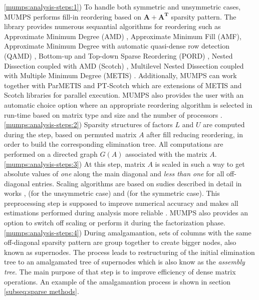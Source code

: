 \ref{mumps:analysis-steps:1}) To handle both symmetric and unsymmetric cases, MUMPS performs fill-in reordering based on $\boldsymbol{A} + \boldsymbol{A^T}$ sparsity pattern. The library provides numerous sequantial algorithms for reordering such as Approximate Minimum Degree (AMD) \cite{reordering:AMD}, Approximate Minimum Fill (AMF), Approximate Minimum Degree with automatic quasi-dense row detection (QAMD) \cite{reordering:QAMD}, Bottom-up and Top-down Sparse Reordering (PORD) \cite{reordering:PORD}, Nested Dissection coupled with AMD (Scotch) \cite{reordering:SCOTCH}, Multilevel Nested Dissection coupled with Multiple Minimum Degree (METIS) \cite{reordering:METIS}. Additionally, MUMPS can work together with ParMETIS and PT-Scotch which are extensions of METIS and Scotch libraries for parallel execution. MUMPS also provides the user with an automatic choice option where an appropriate reordering algorithm is selected in run-time based on matrix type and size and the number of processors \cite{mumps-manual}.\\


\ref{mumps:analysis-steps:2}) Sparsity structures of factors $L$ and $U$ are computed during the step, based on permuted matrix $A$ after fill reducing reordering, in order to build the corresponding elimination tree. All computations are performed on a directed graph $G(A)$ associated with the matrix $A$.\\


\ref{mumps:analysis-steps:3}) At this step, matrix $A$ is scaled in such a way to get absolute values of \textit{one} along the main diagonal and \textit{less than one} for all off-diagonal entries. Scaling algorithms are based on sudies described in detail in works \cite{mm:scaling:duff1999design}, \cite{mm:scaling:duff2001algorithms} (for the unsymmetric case) and \cite{mm:scaling:duff2005strategies} (for the symmetric case). This preprocessing step is supposed to improve numerical accuracy and makes all estimations performed during analysis more reliable \cite{mumps-manual}. MUMPS also provides an option to switch off scaling or perform it during the factorization phase.\\



\ref{mumps:analysis-steps:4}) During amalgamantion, sets of columns with the same off-diagonal sparsity pattern are group together to create bigger nodes, also known as supernodes. The process leads to restructuring of the initial elimination tree to an amalgamated tree of supernodes which is also know as the \textit{assembly tree}. The main purpose of that step is to improve efficiency of dense matrix operations. An example of the amalgamantion process is shown in section \ref{subseq:sparse methods}.\\


